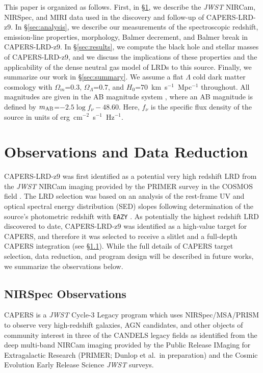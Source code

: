 \documentclass[twocolumn]{aastex7}
\newcommand{\src}{CAPERS-LRD-z9}
\begin{document}
This paper is organized as follows. First, in \S\ref{sec:observations}, we describe the \textit{JWST} NIRCam, NIRSpec, and MIRI data used in the discovery and follow-up of \src{}. In \S\ref{sec:analysis}, we describe our measurements of the spectroscopic redshift, emission-line properties, morphology, Balmer decrement, and Balmer break in \src{}. In \S\ref{sec:results}, we compute the black hole and stellar masses of \src{}, and we discuss the implications of these properties and the applicability of the dense neutral gas model of LRDs to this source. Finally, we summarize our work in \S\ref{sec:summary}. We assume a flat $\Lambda$ cold dark matter cosmology with $\Omega_m$=$0.3$, $\Omega_\Lambda$=$0.7$, and $H_0$=$70$~km~s$^{-1}$~Mpc$^{-1}$ throughout. All magnitudes are given in the AB magnitude system \citep{oke83}, where an AB magnitude is defined by $m_{\rm AB}$=$-2.5\log f_\nu - 48.60$. Here, $f_\nu$ is the specific flux density of the source in units of erg~cm$^{-2}$~s$^{-1}$~Hz$^{-1}$.

\section{Observations and Data Reduction}\label{sec:observations}

\src{} was first identified as a potential very high redshift LRD from the {\it JWST} NIRCam imaging provided by the PRIMER survey \citep{dunlop_2021_primer} in the COSMOS field \citep{kocevski25,barro24b,akins24}. The LRD selection was based on an analysis of the rest-frame UV and optical spectral energy distribution (SED) slopes following determination of the source's photometric redshift with \texttt{EAZY} \citep{brammer08}. As potentially the highest redshift LRD discovered to date, \src{} was identified as a high-value target for CAPERS, and therefore it was selected to receive a slitlet and a full-depth CAPERS integration (see \S\ref{sec:nirspec}). While the full details of CAPERS target selection, data reduction, and program design will be described in future works, we summarize the observations below. 

\subsection{NIRSpec Observations}\label{sec:nirspec}

CAPERS is a {\it JWST} Cycle-3 Legacy program which uses NIRSpec/MSA/PRISM to observe very high-redshift galaxies, AGN candidates, and other objects of community interest in three of the CANDELS legacy fields \citep{grogin11, koekemoer11} as identified from the deep multi-band NIRCam imaging provided by the Public Release IMaging for Extragalactic Research (PRIMER; Dunlop et al.\ in preparation) and the Cosmic Evolution Early Release Science \citep[CEERS;][]{finkelstein25} {\it JWST} surveys. 
\end{document}
